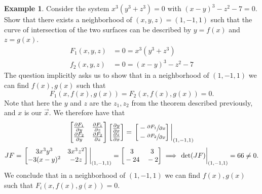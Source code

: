 \documentclass[
	12pt,
	]{article}
\theoremstyle{custom}
\theoremstyle{custom}
\theoremstyle{custom}
\theoremstyle{custom}
\theoremstyle{custom}
\theoremstyle{definition}
\newtheorem{example}{Example}[section]
\theoremstyle{example}
\theoremstyle{note}
\theoremstyle{remark}
\theoremstyle{example}
\newcounter{theo}[section]\setcounter{theo}{0}
\numberwithin{equation}{subsection}
\begin{document}
	   		 \begin{example}
	   		 	Consider the system $x^{3}(y^{3} + z^{3}) = 0 $ with $(x-y)^{3} - z^{2} - 7 =0$. Show that there exists a neighborhood of $(x,y,z) = (1,-1,1)$ such that the curve of intersection of the two surfaces can be described by $y = f(x)$ and $z= g(x)$.
	   		 	\begin{align*}
	   		 		F_{1}(x,y,z) &=0= x^{3}(y^{3} + z^{3}) \\
	   		 		f_{2}(x,y,z) &= 0 = (x-y)^{3} -z^{2}-7
	   		 	\end{align*}
	   		 	The question implicitly asks us to show that in a neighborhood of $(1,-1,1)$ 
	   		 	we can find $f(x), g(x)$ such that 
	   		 	\begin{equation*}
	   		 		F_{1}(x, f(x) , g(x)) = F_{2}(x, f(x), g(x)) = 0.
	   		 	\end{equation*}
	   		 	Note that here the $y$ and $z$ are the $z_{1}, z_{2}$ from the theorem described previously, and $x$ is our $\vec{x}$. We therefore have that 
	   		 	\begin{equation*}
	   		 		\begin{bmatrix}
	   		 			\pdv{F_{1}}{y} & \pdv{F_{1}}{z} \\
	   		 			\pdv{F_{2}}{y} & \pdv{F_{2}}{z}
	   		 		\end{bmatrix}
	   		 		\begin{bmatrix}
	   		 			\pdv{y}{x} \\
	   		 			\pdv{z}{x} 
	   		 		\end{bmatrix}
	   		 		= 
	   		 		\eval{\begin{bmatrix}
	   		 			   		 			\vphantom{\pdv{y}{x}}- \sfrac{\partial F_{1}}{\partial x} \\
	   		 			   		 			\vphantom{\pdv{y}{x}}- \sfrac{\partial F_{2}}{ \partial x}
	   		 			   		 		\end{bmatrix}}_{(1,-1,1)}
	   		 	\end{equation*}
	   		 	\begin{equation*}
	   		 		JF = 
	   		 		\eval{
	   		 			\begin{bmatrix}
	   		 				3x^{3}y^{3} & 3x^{3}z^{2} \\
	   		 				-3(x-y)^{2} & -2z 
	   		 			\end{bmatrix}
	   		 		}_{(1,-1,1)} = 
	   		 		\begin{bmatrix}
	   		 			\vphantom{3x^{3}y^{3} }3 & \vphantom{3x^{3}y^{3} }3 \\
	   		 			\vphantom{3x^{3}y^{3} }-24 &\vphantom{3x^{3}y^{3} } -2
	   		 		\end{bmatrix}
	   		 		\implies \eval{\det(JF)}_{(1,-1,1)} = 66 \neq 0.
	   		 	\end{equation*}
	   		 We conclude that in a neighborhood of $(1,-1,1)$ we can find $f(x) , g(x)$ such that $F_{i}(x, f(x), g(x)) = 0$.
	   		 \end{example}
	   		 
\end{document}

